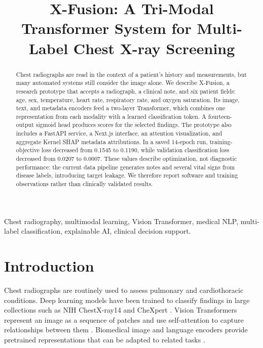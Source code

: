 \documentclass[conference]{IEEEtran}
\begin{document}
\title{X-Fusion: A Tri-Modal Transformer System for Multi-Label Chest X-ray Screening}

\author{
}

\maketitle

\begin{abstract}
Chest radiographs are read in the context of a patient's history and measurements, but many automated systems still consider the image alone. We describe X-Fusion, a research prototype that accepts a radiograph, a clinical note, and six patient fields: age, sex, temperature, heart rate, respiratory rate, and oxygen saturation. Its image, text, and metadata encoders feed a two-layer Transformer, which combines one representation from each modality with a learned classification token. A fourteen-output sigmoid head produces scores for the selected findings. The prototype also includes a FastAPI service, a Next.js interface, an attention visualization, and aggregate Kernel SHAP metadata attributions. In a saved 14-epoch run, training-objective loss decreased from 0.1545 to 0.1190, while validation classification loss decreased from 0.0207 to 0.0007. These values describe optimization, not diagnostic performance: the current data pipeline generates notes and several vital signs from disease labels, introducing target leakage. We therefore report software and training observations rather than clinically validated results.
\end{abstract}

\begin{IEEEkeywords}
Chest radiography, multimodal learning, Vision Transformer, medical NLP, multi-label classification, explainable AI, clinical decision support.
\end{IEEEkeywords}

\section{Introduction}
Chest radiographs are routinely used to assess pulmonary and cardiothoracic conditions. Deep learning models have been trained to classify findings in large collections such as NIH ChestX-ray14 and CheXpert \cite{wang2017,irvin2019}. Vision Transformers represent an image as a sequence of patches and use self-attention to capture relationships between them \cite{dosovitskiy2021}. Biomedical image and language encoders provide pretrained representations that can be adapted to related tasks \cite{biomedclip2023,cxrbert2022}.
\end{document}
